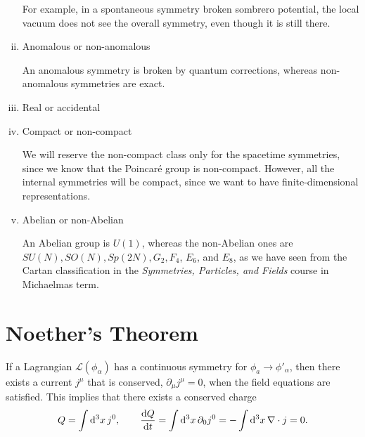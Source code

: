 \begin{enumerate}[(i)]
    For example, in a spontaneous symmetry broken sombrero potential, the local vacuum does not see the overall symmetry, even though it is still there.
  \item Anomalous or non-anomalous

    An anomalous symmetry is broken by quantum corrections, whereas non-anomalous symmetries are exact.

  \item Real or accidental
  \item Compact or non-compact

    We will reserve the non-compact class only for the spacetime symmetries, since we know that the Poincaré group is non-compact.
    However, all the internal symmetries will be compact, since we want to have finite-dimensional representations.

  \item Abelian or non-Abelian

    An Abelian group is $U(1)$, whereas the non-Abelian ones are $SU(N), SO(N), Sp(2N), G_2, F_4$, $E_6$, and $E_8$, as we have seen from the Cartan classification in the \emph{Symmetries, Particles, and Fields} course in Michaelmas term.
\end{enumerate}

\section{Noether's Theorem}%
\label{sec:noether_s_theorem}

If a Lagrangian $\mathscr{L}(\phi_\alpha)$ has a continuous symmetry for $\phi_a  \to \phi'_\alpha$, then there exists a current  $j^{\mu}$  that is conserved, $\partial_{\mu} j^{\mu} = 0$, when the field equations are satisfied.
This implies that there exists a conserved charge
\begin{equation}
  Q = \int \dd[3]{x} j^0, \qquad \dv{Q}{t} = \int \dd[3]{x} \partial_0 j^0 = - \int \dd[3]{x} \nabla \cdot j = 0.
\end{equation}

